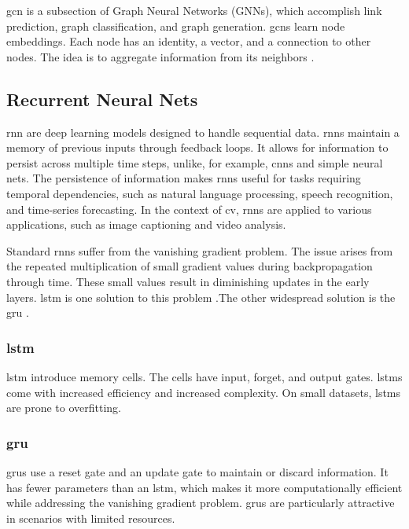 \acrfull{gcn} is a subsection of Graph Neural Networks (GNNs), which accomplish link prediction, graph classification, and graph generation. \acrshort{gcn}s learn node embeddings. Each node has an identity, a vector, and a connection to other nodes. The idea is to aggregate information from its neighbors \cite{kipf_gcn_2017}.

\subsection{Recurrent Neural Nets}

\acrfull{rnn} are deep learning models designed to handle sequential data. 
\acrshort{rnn}s maintain a memory of previous inputs through feedback loops. It allows for information to persist across multiple time steps, unlike, for example, \acrshort{cnn}s and simple neural nets. The persistence of information makes \acrshort{rnn}s useful for tasks requiring temporal dependencies, such as natural language processing, speech recognition, and time-series forecasting\cite{ibm_rnn_2025}. In the context of \acrfull{cv}, \acrshort{rnn}s are applied to various applications, such as image captioning and video analysis. 

Standard \acrshort{rnn}s suffer from the vanishing gradient problem. The issue arises from the repeated multiplication of small gradient values during backpropagation through time. These small values result in diminishing updates in the early layers. \acrfull{lstm} is one solution to this problem \cite{bhogal_human_2023, kumar_human_2023, mahaseni_spotting_2021}.The other widespread solution is the \acrfull{gru} \cite{giveki_human_2024,li_oarnet_2024,yu_i3d_2023}. 

\subsubsection{\acrfull{lstm}}
\acrlong{lstm} introduce memory cells. The cells have input, forget, and output gates. \acrshort{lstm}s come with increased efficiency and increased complexity. On small datasets, \acrshort{lstm}s are prone to overfitting. 

\subsubsection{\acrfull{gru}}
\acrlong{gru}s use a reset gate and an update gate to maintain or discard information\cite{cho_gru_2014}. It has fewer parameters than an \acrshort{lstm}, which makes it more computationally efficient while addressing the vanishing gradient problem. \acrshort{gru}s are particularly attractive in scenarios with limited resources. 

